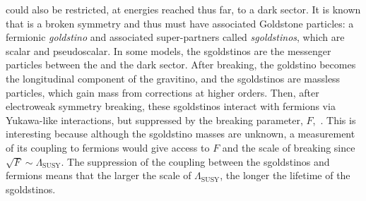 \SUSY could also be restricted, at energies reached thus far, to a dark sector.
It is known that \SUSY is a broken symmetry and thus must have associated Goldstone particles:
a fermionic \emph{goldstino} and associated super-partners called \emph{sgoldstinos}, which are
scalar and pseudoscalar.
In some models, the sgoldstinos are the messenger particles between the \sm and the dark \SUSY
sector.
After \SUSY breaking, the goldstino becomes the longitudinal component of the gravitino, and the
sgoldstinos are massless particles, which gain mass from corrections at higher orders.
Then, after electroweak symmetry breaking, these sgoldstinos interact with \sm fermions via
Yukawa-like interactions, but suppressed by the \SUSY breaking parameter,
$F$,~\cite{Alekhin:2015byh}.
This is interesting because although the sgoldstino masses are unknown, a measurement of its
coupling to fermions would give access to $F$ and the scale of \SUSY breaking since
$\sqrt{F}\sim\Lambda_\mathrm{SUSY}$.
The suppression of the coupling between the sgoldstinos and fermions means that the larger the
scale of $\Lambda_\mathrm{SUSY}$, the longer the lifetime of the sgoldstinos.


